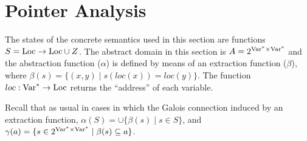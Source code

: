 \section{Pointer Analysis}
The states of the concrete semantics used in this section are functions $S = \text{Loc} \rightarrow \text{Loc} \cup Z$. The abstract domain in this section is $A = 2^{\text{Var}^* \times \text{Var}^*}$ and the abstraction function ($\alpha$) is defined by means of an extraction function ($\beta$), where $\beta(s)=\{(x,y)\mid s(loc(x))=loc(y)\}$. The function $loc: \text{Var}^* \rightarrow \text{Loc}$ returns the ``address'' of each variable.

Recall that as usual in cases in which the Galois connection induced by an extraction function, $\alpha(S)=\cup\{\beta(s)\mid s\in S\}$, and $\gamma(a)=\{s\in2^{\text{Var}^*\times\text{Var}^*}\mid\beta(s)\subseteq a\}$.


